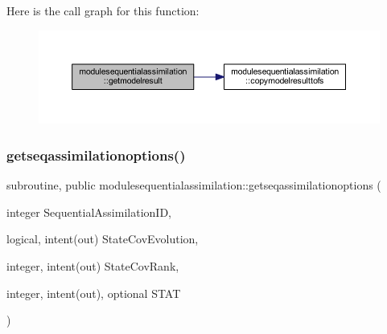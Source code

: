 Here is the call graph for this function\+:\nopagebreak
\begin{figure}[H]
\begin{center}
\leavevmode
\includegraphics[width=350pt]{namespacemodulesequentialassimilation_a817e5028ea901157ba1c90a514305c15_cgraph}
\end{center}
\end{figure}
\mbox{\label{namespacemodulesequentialassimilation_a1df3565c62b239e627e2abf8edf5339e}} 
\subsubsection{\texorpdfstring{getseqassimilationoptions()}{getseqassimilationoptions()}}
{\footnotesize\ttfamily subroutine, public modulesequentialassimilation\+::getseqassimilationoptions (\begin{DoxyParamCaption}\item[{integer}]{Sequential\+Assimilation\+ID,  }\item[{logical, intent(out)}]{State\+Cov\+Evolution,  }\item[{integer, intent(out)}]{State\+Cov\+Rank,  }\item[{integer, intent(out), optional}]{S\+T\+AT }\end{DoxyParamCaption})}

